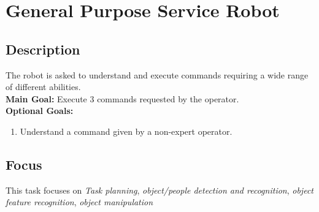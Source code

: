 \section{General Purpose Service Robot}
\label{test:gpsr}

\subsection*{Description}

The robot is asked to understand and execute commands requiring a wide range of different abilities. \\

\noindent \textbf{Main Goal:} Execute 3 commands requested by the operator.\\

\noindent \textbf{Optional Goals:}
\begin{enumerate}[nosep]
	\item Understand a command given by a non-expert operator.
\end{enumerate}

\subsection*{Focus}
This task focuses on
\emph{Task planning}, 
\emph{object/people detection and recognition}, 
\emph{object feature recognition}, 
\emph{object manipulation}


